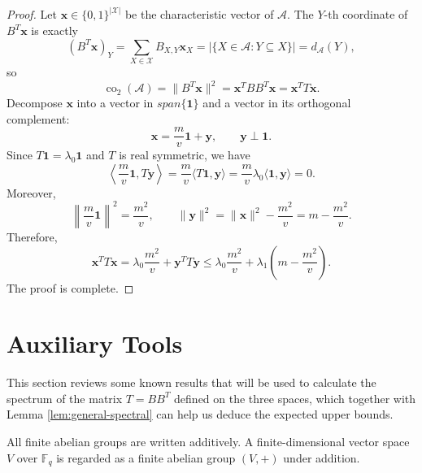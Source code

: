 \documentclass[11pt]{article}
\theoremstyle{definition}
\newcommand{\Fq}{\mathbb F_q}
\newcommand{\co}{\operatorname{co}_2}
\begin{document}
\begin{proof}
Let $\bm{x}\in\{0,1\}^{|\mathscr{X}|}$ be the characteristic vector of $\mathcal A$.  The $Y$-th coordinate of $B^T\bm{x}$ is exactly
\[
(B^T\bm{x})_Y=\sum_{X\in \mathscr{X}}B_{X,Y}\bm{x}_X=|\{X\in\mathcal A:Y\subseteq X\}|=d_{\mathcal A}(Y),
\]
so
\[
\co(\mathcal A)=\|B^T\bm{x}\|^2=\bm{x}^TBB^T\bm{x}=\bm{x}^TT\bm{x}.
\]
Decompose $\bm{x}$ into a vector in $span\{\mathbf{1}\}$ and a vector in its orthogonal complement:
\[
\bm{x}=\frac{m}{v}\mathbf 1+\bm{y},
\qquad \bm{y}\perp \mathbf 1.
\]
Since $T\mathbf 1=\lambda_0\mathbf 1$ and $T$ is real symmetric, we have
\[
\left\langle \frac{m}{v}\mathbf 1,T\bm{y}\right\rangle
=\frac{m}{v}\langle T\mathbf 1,\bm{y}\rangle
=\frac{m}{v}\lambda_0\langle \mathbf 1,\bm{y}\rangle=0.
\]
Moreover,
\[
\left\|\frac{m}{v}\mathbf 1\right\|^2=\frac{m^2}{v},
\qquad
\|\bm{y}\|^2=\|\bm{x}\|^2-\frac{m^2}{v}=m-\frac{m^2}{v}.
\]
Therefore,
\[
\bm{x}^TT\bm{x}=\lambda_0\frac{m^2}{v}+\bm{y}^TT\bm{y}
\le \lambda_0\frac{m^2}{v}+\lambda_1\left(m-\frac{m^2}{v}\right).
\]
The proof is complete.
\end{proof}

\section{Auxiliary Tools}

This section reviews some known results that will be used to calculate the spectrum  of the matrix $T=BB^T$ defined on the three spaces, which together with Lemma \ref{lem:general-spectral} can help us deduce the expected upper bounds.

\vskip 2mm
\vskip 2mm

All finite abelian groups are written additively. A finite-dimensional vector space $V$ over $\Fq$ is regarded as a finite abelian group $(V,+)$ under addition. 
\end{document}

